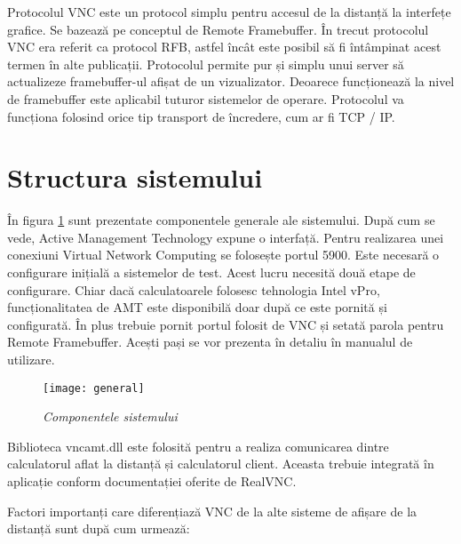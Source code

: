 Protocolul VNC este un protocol simplu pentru accesul de la distanță la interfețe grafice. Se bazează pe conceptul de Remote Framebuffer. În trecut protocolul VNC era referit ca protocol RFB, astfel încât este posibil să fi întâmpinat acest termen în alte publicații. Protocolul permite pur și simplu unui server să actualizeze framebuffer-ul afișat de un vizualizator. Deoarece funcționează la nivel de framebuffer este aplicabil tuturor sistemelor de operare. Protocolul va funcționa folosind orice tip transport de încredere, cum ar fi TCP / IP.

\section{Structura sistemului}


În figura \ref{general} sunt prezentate componentele generale ale sistemului. După cum se vede, Active Management Technology expune o interfață. Pentru realizarea unei conexiuni Virtual Network Computing se folosește portul 5900. Este necesară o configurare inițială a sistemelor de test. Acest lucru necesită două etape de configurare. Chiar dacă calculatoarele folosesc tehnologia Intel vPro, funcționalitatea de AMT este disponibilă doar după ce este pornită și configurată. În plus trebuie pornit portul folosit de VNC și setată parola pentru Remote Framebuffer. Acești pași se vor prezenta în detaliu în manualul de utilizare.

\begin{figure}
    \centering
    \texttt{[image: general]}
    \caption{\textit{Componentele sistemului}}
    \label{general}
\end{figure}

Biblioteca vncamt.dll este folosită pentru a realiza comunicarea dintre calculatorul aflat la distanță și calculatorul client. Aceasta trebuie integrată în aplicație conform documentației oferite de RealVNC.
 


Factori importanți care diferențiază VNC de la alte sisteme de afișare de la distanță sunt după cum urmează:

